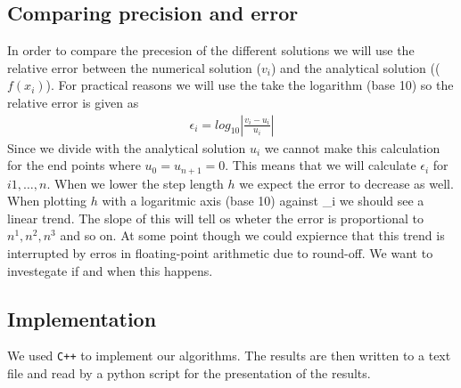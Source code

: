 \documentclass[american,a4paper,12pt]{article}
\begin{document}
\subsection{Comparing precision and error}
In order to compare the precesion of the different solutions we will use the relative error between the numerical solution ($v_i$) and the analytical solution (($f(x_i)$). For practical reasons we will use the take the logarithm (base 10) so the relative error is given as
\begin{align*}
  \epsilon_i = log_{10}\left|\frac{v_i - u_i}{u_i}\right|
\end{align*}
Since we divide with the analytical solution $u_i$ we cannot make this calculation for the end points where $u_0 = u_{n+1} = 0$. This means that we will calculate $\epsilon_i$ for $i 1, \hdots, n$. When we lower the step length $h$ we expect the error to decrease as well. When plotting $h$ with a logaritmic axis (base 10) against \epsilon_i we should see a linear trend. The slope of this will tell os wheter the error is proportional to $n^1, n^2, n^3$ and so on. At some point though we could expiernce that this trend is interrupted by erros in floating-point arithmetic due to round-off. We want to investegate if and when this happens.
\subsection{Implementation}
We used \verb!C++! to implement our algorithms. The results are then written to a text file and read by a python script for the presentation of the results.
\end{document}
